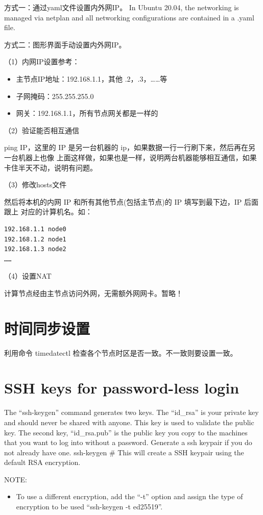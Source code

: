 {方式一：通过yaml文件设置内外网IP。
In Ubuntu 20.04, the networking is managed via netplan and all networking configurations are
contained in a .yaml file.

方式二：图形界面手动设置内外网IP。

（1）内网IP设置参考：
\begin{itemize}
\item 主节点IP地址：192.168.1.1，其他 .2，.3，……等
\item 子网掩码：255.255.255.0
\item 网关：192.168.1.1，所有节点网关都是一样的
\end{itemize}

（2）验证能否相互通信

ping IP，这里的 IP 是另一台机器的 ip，如果数据一行一行刷下来，然后再在另一台机器上也像
上面这样做，如果也是一样，说明两台机器能够相互通信，如果卡住半天不动，说明有问题。

（3）修改hosts文件

然后将本机的内网 IP 和所有其他节点(包括主节点)的 IP 填写到最下边，IP 后面跟上
对应的计算机名。如：
\begin{verbatim}
192.168.1.1 node0
192.168.1.2 node1
192.168.1.3 node2
……
\end{verbatim}

（4）设置NAT

计算节点经由主节点访问外网，无需额外网网卡。暂略！



\section{时间同步设置}
利用命令 timedatectl 检查各个节点时区是否一致。不一致则要设置一致。


\section{SSH keys for password-less login}
The “ssh-keygen” command generates two keys. The “id\_rsa” is your private key and should never
be shared with anyone. This key is used to validate the public key. The second key, “id\_rsa.pub” is
the public key you copy to the machines that you want to log into without a password.
Generate a ssh keypair if you do not already have one.
ssh-keygen \# This will create a SSH keypair using the default RSA encryption.

NOTE:
\begin{itemize}
\item To use a different encryption, add the “-t” option and assign the type of encryption to be
used “ssh-keygen -t ed25519”.
\end{itemize}

}
